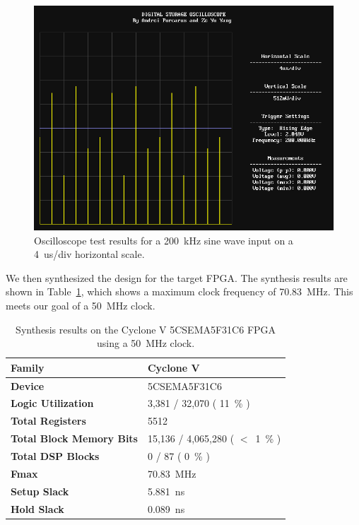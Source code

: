 \documentclass[journal]{IEEEtran}
\begin{document}
\begin{figure}[!htb]
  \centering
  \includegraphics[width=\columnwidth]{test-results/scope_demo_200kHz.png}
  \caption{Oscilloscope test results for a 200~kHz sine wave input on a 4~us/div horizontal scale.}
  \label{fig:scope_test_4}
\end{figure}

We then synthesized the design for the target FPGA. The synthesis results are shown in Table~\ref{tab:synthesis_results}, which shows a maximum clock frequency of 70.83~MHz. This meets our goal of a 50~MHz clock.

\begin{table}[!htb]
  \centering
  \caption{Synthesis results on the Cyclone V 5CSEMA5F31C6 FPGA using a 50~MHz clock.}
  \label{tab:synthesis_results}
  \begin{tabular}[c]{ | l | l | }
    \hline
    \textbf{Family} & Cyclone V \\
    \hline
    \textbf{Device} & 5CSEMA5F31C6 \\
    \hline
    \textbf{Logic Utilization} & 3,381 / 32,070 ( 11~\% ) \\
    \hline
    \textbf{Total Registers} & 5512 \\
    \hline
    \textbf{Total Block Memory Bits} & 15,136 / 4,065,280 ( $<$~1~\% ) \\
    \hline
    \textbf{Total DSP Blocks} & 0 / 87 ( 0~\% ) \\
    \hline
    \textbf{Fmax} & 70.83~MHz \\
    \hline
    \textbf{Setup Slack} & 5.881~ns \\
    \hline
    \textbf{Hold Slack} & 0.089~ns \\
    \hline
  \end{tabular}
\end{table}
\end{document}
